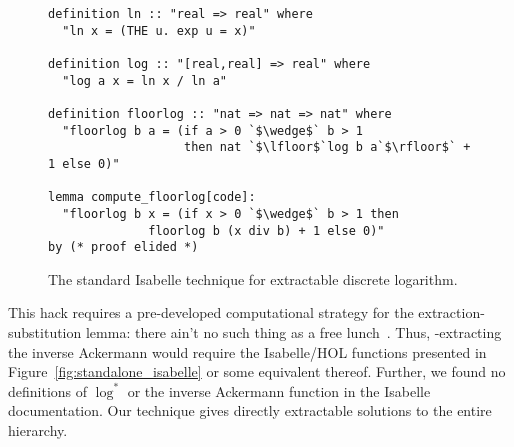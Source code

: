 \begin{figure}
\begin{lstlisting}
definition ln :: "real => real" where
  "ln x = (THE u. exp u = x)"

definition log :: "[real,real] => real" where
  "log a x = ln x / ln a"

definition floorlog :: "nat => nat => nat" where
  "floorlog b a = (if a > 0 `$\wedge$` b > 1 
                   then nat `$\lfloor$`log b a`$\rfloor$` + 1 else 0)"

lemma compute_floorlog[code]:
  "floorlog b x = (if x > 0 `$\wedge$` b > 1 then 
              floorlog b (x div b) + 1 else 0)"
by (* proof elided *)
\end{lstlisting}
\caption{The standard Isabelle technique for extractable discrete logarithm.}
\label{fig:isabelle_hack}
\end{figure}

This hack requires a pre-developed computational strategy 
for the \li{[code]} extraction-substitution lemma: there ain't no such thing 
as a free lunch~\cite{moonmistress}. Thus, \li{[code]}-extracting the inverse 
Ackermann would require the Isabelle/HOL functions presented in Figure~\ref{fig:standalone_isabelle} or some equivalent thereof. 
Further, we found no definitions of $\log^*$ 
or the inverse Ackermann function in the Isabelle documentation. Our technique 
gives directly extractable solutions to the entire hierarchy.
\lstset{style=myStyle}

